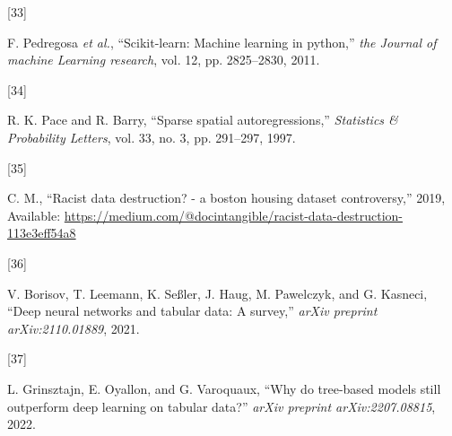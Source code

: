 \documentclass[conference,final,]{IEEEtran}
\newlength{\cslhangindent}
\newlength{\csllabelwidth}
\newlength{\cslentryspacingunit} %
\newenvironment{CSLReferences}[2] %
 {%
  \setlength{\parindent}{0pt}
  \ifodd #1
  \let\oldpar\par
  \def\par{\hangindent=\cslhangindent\oldpar}
  \fi
  \setlength{\parskip}{#2\cslentryspacingunit}
 }%
 {}
\newcommand{\CSLLeftMargin}[1]{\parbox[t]{\csllabelwidth}{#1}}
\newcommand{\CSLRightInline}[1]{\parbox[t]{\linewidth - \csllabelwidth}{#1}\break}
\begin{document}
\begin{CSLReferences}{0}{0}
\leavevmode{}%
\CSLLeftMargin{{[}33{]} }%
\CSLRightInline{F. Pedregosa \emph{et al.}, {``Scikit-learn: Machine learning in python,''} \emph{the Journal of machine Learning research}, vol. 12, pp. 2825--2830, 2011.}

\leavevmode{}%
\CSLLeftMargin{{[}34{]} }%
\CSLRightInline{R. K. Pace and R. Barry, {``Sparse spatial autoregressions,''} \emph{Statistics \& Probability Letters}, vol. 33, no. 3, pp. 291--297, 1997.}

\leavevmode{}%
\CSLLeftMargin{{[}35{]} }%
\CSLRightInline{C. M., {``Racist data destruction? - a boston housing dataset controversy,''} 2019, Available: \url{https://medium.com/@docintangible/racist-data-destruction-113e3eff54a8}}

\leavevmode{}%
\CSLLeftMargin{{[}36{]} }%
\CSLRightInline{V. Borisov, T. Leemann, K. Seßler, J. Haug, M. Pawelczyk, and G. Kasneci, {``Deep neural networks and tabular data: A survey,''} \emph{arXiv preprint arXiv:2110.01889}, 2021.}

\leavevmode{}%
\CSLLeftMargin{{[}37{]} }%
\CSLRightInline{L. Grinsztajn, E. Oyallon, and G. Varoquaux, {``Why do tree-based models still outperform deep learning on tabular data?''} \emph{arXiv preprint arXiv:2207.08815}, 2022.}

\end{CSLReferences}
\end{document}
